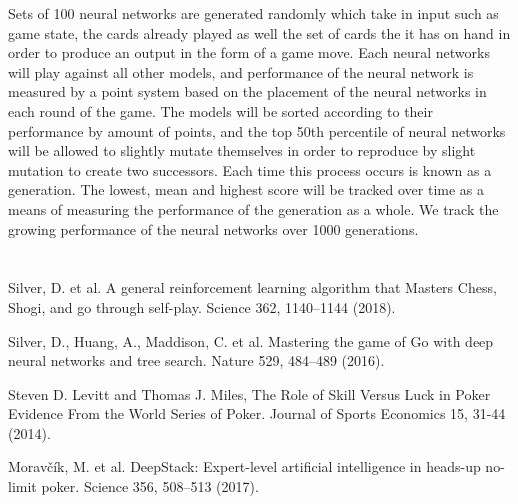 \documentclass[]{article}
\begin{document}
	Sets of 100 neural networks are generated randomly which take in input such as game state, the cards already played as well the set of cards the it has on hand in order to produce an output in the form of a game move. Each neural networks will play against all other models, and performance of the neural network is measured by a point system based on the placement of the neural networks in each round of the game. The models will be sorted according to their performance by amount of points, and the top 50th percentile of neural networks will be allowed to slightly mutate themselves in order to reproduce by slight mutation to create two successors. Each time this process occurs is known as a generation. The lowest, mean and highest score will be tracked over time as a means of measuring the performance of the generation as a whole. We track the growing performance of the neural networks over 1000 generations.
	
	\section*{}
	
	
	\begin{thebibliography}{9}
		
		
		Silver, D. et al. A general reinforcement learning algorithm that Masters Chess, Shogi, and go through self-play. Science 362, 1140–1144 (2018). 
		
		Silver, D., Huang, A., Maddison, C. et al. Mastering the game of Go with deep neural networks and tree search. Nature 529, 484–489 (2016). 
		
		Steven D. Levitt and Thomas J. Miles,
		The Role of Skill Versus Luck in Poker Evidence From the World Series of Poker. Journal of Sports Economics 15, 31-44 (2014).
		
		Moravčík, M. et al. DeepStack: Expert-level artificial intelligence in heads-up no-limit poker. Science 356, 508–513 (2017). 
		
	\end{thebibliography}
	
\end{document}
